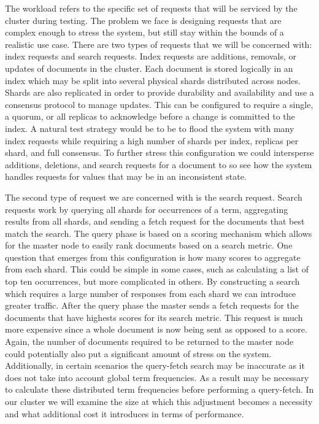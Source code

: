 \documentclass[journal]{IEEEtran}
\begin{document}
The workload refers to the specific set of requests that will be serviced by the cluster during testing. The problem we face is designing requests that are complex enough to stress the system, but still stay within the bounds of a realistic use case. There are two types of requests that we will be concerned with: index requests and search requests. Index requests are additions, removals, or updates of documents in the cluster. Each document is stored logically in an index which may be split into several physical shards distributed across nodes. Shards are also replicated in order to provide durability and availability and use a consensus protocol to manage updates. This can be configured to require a single, a quorum, or all replicas to acknowledge before a change is committed to the index. A natural test strategy would be to be to flood the system with many index requests while requiring a high number of shards per index, replicas per shard, and full consensus. To further stress this configuration we could intersperse additions, deletions, and search requests for a document to so see how the system handles requests for values that may be in an inconsistent state. 

The second type of request we are concerned with is the search request. Search requests work by querying all shards for occurrences of a term, aggregating results from all shards, and sending a fetch request for the documents that best match the search. The query phase is based on a scoring mechanism which allows for the master node to easily rank documents based on a search metric. One question that emerges from this configuration is how many scores to aggregate from each shard. This could be simple in some cases, such as calculating a list of top ten occurrences, but more complicated in others. By constructing a search which requires a large number of responses from each shard we can introduce greater traffic. After the query phase the master sends a fetch requests for the documents that have highests scores for its search metric. This request is much more expensive since a whole document is now being sent as opposed to a score. Again, the number of documents required to be returned to the master node could potentially also put a significant amount of stress on the system. Additionally, in certain scenarios the query-fetch search may be inaccurate as it does not take into account global term frequencies.  As a result may be necessary to calculate these distributed term frequencies before performing a query-fetch. In our cluster we will examine the size at which this adjustment becomes a necessity and what additional cost it introduces in terms of performance. 
\end{document}
